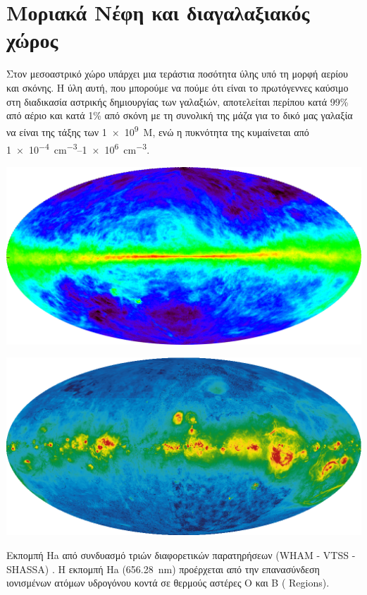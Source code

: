 \section{Μοριακά Νέφη και διαγαλαξιακός χώρος}
Στον μεσοαστρικό χώρο υπάρχει μια τεράστια ποσότητα ύλης υπό τη μορφή αερίου και σκόνης. Η ύλη αυτή, που μπορούμε να πούμε ότι είναι το πρωτόγεννες καύσιμο στη διαδικασία αστρικής δημιουργίας των γαλαξιών, αποτελείται περίπου κατά 99\% από αέριο και κατά 1\% από σκόνη με τη συνολική της μάζα για το δικό μας γαλαξία να είναι της τάξης των \SI{1e9}{ M_{\odot}}, ενώ η πυκνότητα της κυμαίνεται από \SIrange{1e-4}{1e6}{cm^{-3}}.

\begin{marginfigure}
	\label{fig:21}
	\centering
	\includegraphics[width=1\linewidth]{Images/21.png}
	\caption{Εκπομπή του  στα 21.1 cm (Kalberla et al., 2005)%
		H εκπομπή της γραμμής $21.1 \, cm$ στα ραδιοκύματα που οφείλεται στη μετάπτωση αντιστροφής του spin του πρωτονίου και του ηλεκτρονίου στη βασική κατάσταση του ατόμου του Υδρογόνου. Η ενεργειακή διαφορά των καταστάσεων είναι 
		$h \nu=\SI{6e-6}{eV}$, η οποία αντιστοιχεί σε μήκος κύματος \SI{21}{cm}.}
\end{marginfigure}

\begin{marginfigure}
	\label{fig:Ha}
	\centering
	\includegraphics[width=1\linewidth]{Images/Ha.png}
	\caption{Εκπομπή Ha από συνδυασμό τριών διαφορετικών παρατηρήσεων (WHAM - VTSS - SHASSA) \cite{finkbeiner_2003}. Η εκπομπή Ha (\SI{656.28}{nm}) προέρχεται από την επανασύνδεση ιονισμένων ατόμων υδρογόνου κοντά σε θερμούς αστέρες O και B ( Regions).}
\end{marginfigure}


